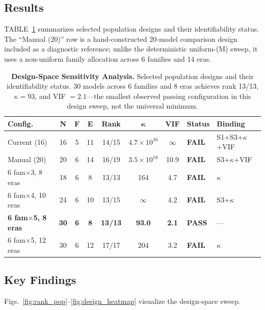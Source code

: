 \documentclass[11pt]{article}
\theoremstyle{definition}
\theoremstyle{plain}
\begin{document}
\subsection{Results}
TABLE~\ref{tab:design_sweep} summarizes selected population designs and their identifiability status. The ``Manual (20)'' row is a hand-constructed 20-model comparison design included as a diagnostic reference; unlike the deterministic uniform-(M) sweep, it uses a non-uniform family allocation across 6 families and 14 eras.

\begin{table}[!htbp]
\caption{\textbf{Design-Space Sensitivity Analysis.} Selected population designs and their identifiability status. 30 models across 6 families and 8 eras achieves rank 13/13, $\kappa = 93$, and VIF $= 2.1$---the smallest observed passing configuration in this design sweep, not the universal minimum.}
\label{tab:design_sweep}
\centering
\footnotesize
\begin{tabular}{l c c c c c c l l}
\hline
\textbf{Config.} & \textbf{N} & \textbf{F} & \textbf{E} & \textbf{Rank} & $\boldsymbol{\kappa}$ & \textbf{VIF} & \textbf{Status} & \textbf{Binding} \\
\hline
Current (16) & 16 & 5 & 11 & 14/15 & $4.7\!\times\!10^{16}$ & $\infty$ & \textbf{FAIL} & S1+S3+$\kappa$+VIF \\
\hline
Manual (20) & 20 & 6 & 14 & 16/19 & $3.5\!\times\!10^{18}$ & 10.9 & \textbf{FAIL} & S3+$\kappa$+VIF \\
\hline
6 fam$\times$3, 8 eras & 18 & 6 & 8 & 13/13 & 164 & 4.7 & \textbf{FAIL} & $\kappa$ \\
\hline
6 fam$\times$4, 10 eras & 24 & 6 & 10 & 13/15 & $\infty$ & 4.2 & \textbf{FAIL} & S3+$\kappa$ \\
\hline
\textbf{6 fam$\times$5, 8 eras} & \textbf{30} & \textbf{6} & \textbf{8} & \textbf{13/13} & \textbf{93.0} & \textbf{2.1} & \textbf{PASS} & --- \\
\hline
6 fam$\times$5, 12 eras & 30 & 6 & 12 & 17/17 & 204 & 3.2 & \textbf{FAIL} & $\kappa$ \\
\hline
\end{tabular}
\end{table}

\subsection{Key Findings}
Figs.~\ref{fig:rank_pop}--\ref{fig:design_heatmap} visualize the design-space sweep.
\end{document}
